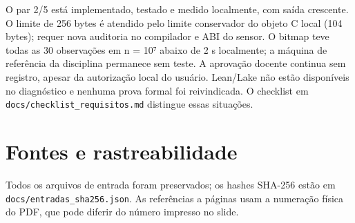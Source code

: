 \documentclass[
  brazilian,
  11pt,
  a4paper,
]{article}
\let\oldsection\section
\renewcommand{\section}{\Needspace{6\baselineskip}\oldsection}
\begin{document}
O par 2/5 está implementado, testado e medido localmente, com saída
crescente. O limite de 256 bytes é atendido pelo limite conservador do
objeto C local (104 bytes); requer nova auditoria no compilador e ABI do
sensor. O bitmap teve todas as 30 observações em n = 10⁷ abaixo de 2 s
localmente; a máquina de referência da disciplina permanece sem teste. A
aprovação docente continua sem registro, apesar da autorização local do
usuário. Lean/Lake não estão disponíveis no diagnóstico e nenhuma prova
formal foi reivindicada. O checklist em
\texttt{docs/\allowbreak{}checklist\_\allowbreak{}requisitos.\allowbreak{}md}
distingue essas situações.

\section{Fontes e rastreabilidade}\label{fontes-e-rastreabilidade}

Todos os arquivos de entrada foram preservados; os hashes SHA-256 estão
em
\texttt{docs/\allowbreak{}entradas\_\allowbreak{}sha256.\allowbreak{}json}.
As referências a páginas usam a numeração física do PDF, que pode
diferir do número impresso no slide.
\end{document}
